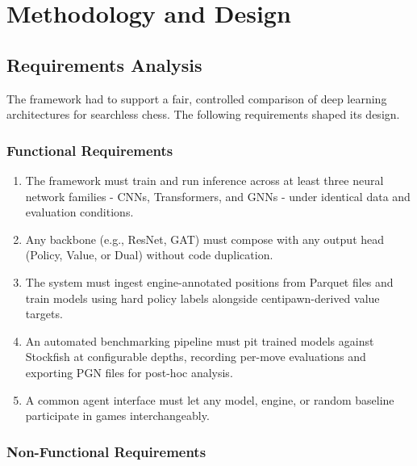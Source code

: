 \chapter{Methodology and Design}

\section{Requirements Analysis}
The framework had to support a fair, controlled comparison of deep learning architectures for searchless chess. The following requirements shaped its design.

\subsection{Functional Requirements}

\begin{enumerate}
    \item The framework must train and run inference across at least three neural network families - CNNs, Transformers, and GNNs - under identical data and evaluation conditions.
    \item Any backbone (e.g., ResNet, GAT) must compose with any output head (Policy, Value, or Dual) without code duplication.
    \item The system must ingest engine-annotated positions from Parquet files and train models using hard policy labels alongside centipawn-derived value targets.
    \item An automated benchmarking pipeline must pit trained models against Stockfish at configurable depths, recording per-move evaluations and exporting PGN files for post-hoc analysis.
    \item A common agent interface must let any model, engine, or random baseline participate in games interchangeably.
\end{enumerate}

\subsection{Non-Functional Requirements}

